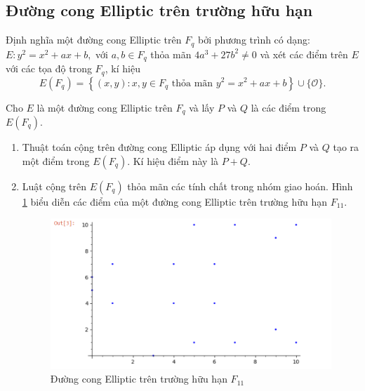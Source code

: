 \documentclass[../main.tex]{subfiles}
\begin{document}
\subsection{Đường cong Elliptic trên trường hữu hạn}
Định nghĩa một đường cong Elliptic trên $F_q$ bởi phương trình có dạng: $E\colon y^2=x^2+ax+b,$ với $a,b\in {F}_q$ thỏa mãn $4a^3+27b^2\ne 0$ và  xét các điểm trên $E$ với các tọa độ trong $F_q$, kí hiệu
$$E({F}_q)=\left\{(x,y):x,y\in {F}_q \text{ thỏa mãn } y^2=x^2+ax+b\right\}\cup \{\mathcal{O}\}.$$
\vspace{-1cm}
\begin{dl}
Cho $E$ là  một đường cong Elliptic trên $F_q$ và lấy $P$ và $Q$ là các điểm trong $E(F_q)$.
\begin{enumerate}
\item Thuật toán cộng trên đường cong Elliptic áp dụng với hai điểm $P$ và $Q$ tạo ra một điểm trong $E(F_q)$. Kí hiệu điểm này là $P+Q$.
\item Luật cộng trên $E(F_q)$ thỏa mãn các tính chất trong nhóm giao hoán.
Hình \ref{fig:F11} biểu diễn các điểm của một đường cong Elliptic trên trường hữu hạn $F_{11}$. 

\begin{figure}[h!]
    \centering
    \includegraphics[scale = 0.7]{Figure/Fp.png}
    \caption{Đường cong Elliptic trên trường hữu hạn $F_{11}$}
    \label{fig:F11}
\end{figure}
\end{enumerate}
\end{dl}
\end{document}
